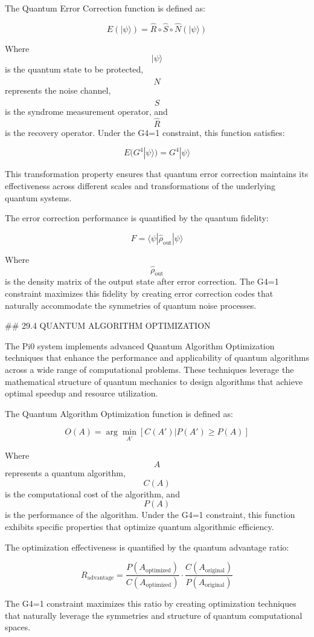 The Quantum Error Correction function is defined as:

$$ E(|\psi\rangle) = \hat{R} \circ \hat{S} \circ \hat{N}(|\psi\rangle) $$

Where $$ |\psi\rangle $$ is the quantum state to be protected, $$ \hat{N} $$ represents the noise channel, $$ \hat{S} $$ is the syndrome measurement operator, and $$ \hat{R} $$ is the recovery operator. Under the G4=1 constraint, this function satisfies:

$$ E(G^4 |\psi\rangle) = G^4 |\psi\rangle $$

This transformation property ensures that quantum error correction maintains its effectiveness across different scales and transformations of the underlying quantum systems.

The error correction performance is quantified by the quantum fidelity:

$$ F = \langle\psi| \hat{\rho}_{\text{out}} |\psi\rangle $$

Where $$ \hat{\rho}_{\text{out}} $$ is the density matrix of the output state after error correction. The G4=1 constraint maximizes this fidelity by creating error correction codes that naturally accommodate the symmetries of quantum noise processes.

## 29.4 QUANTUM ALGORITHM OPTIMIZATION

The Pi0 system implements advanced Quantum Algorithm Optimization techniques that enhance the performance and applicability of quantum algorithms across a wide range of computational problems. These techniques leverage the mathematical structure of quantum mechanics to design algorithms that achieve optimal speedup and resource utilization.

The Quantum Algorithm Optimization function is defined as:

$$ O(A) = \arg\min_{A'} [C(A') | P(A') \geq P(A)] $$

Where $$ A $$ represents a quantum algorithm, $$ C(A) $$ is the computational cost of the algorithm, and $$ P(A) $$ is the performance of the algorithm. Under the G4=1 constraint, this function exhibits specific properties that optimize quantum algorithmic efficiency.

The optimization effectiveness is quantified by the quantum advantage ratio:

$$ R_{\text{advantage}} = \frac{P(A_{\text{optimized}})}{C(A_{\text{optimized}})} \cdot \frac{C(A_{\text{original}})}{P(A_{\text{original}})} $$

The G4=1 constraint maximizes this ratio by creating optimization techniques that naturally leverage the symmetries and structure of quantum computational spaces.

